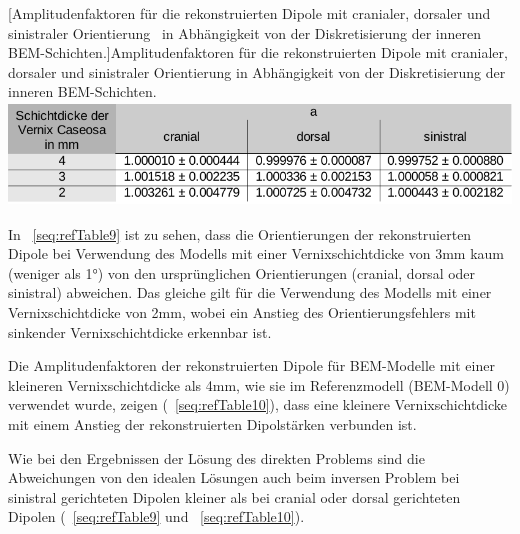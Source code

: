 \begin{center}
\begin{minipage}{17cm}
[Amplitudenfaktoren für die rekonstruierten Dipole mit
cranialer, dorsaler und sinistraler Orientierung \ in Abhängigkeit von
der Diskretisierung der inneren BEM{}-Schichten.]{Amplitudenfaktoren
für die rekonstruierten Dipole mit cranialer, dorsaler und sinistraler
Orientierung  in Abhängigkeit von der Diskretisierung der inneren
BEM-Schichten.}
\label{seq:refTable10}
\includegraphics[width=13.951cm,height=2.752cm]{BA-img/BA-img23.pdf}\end{minipage}
\end{center}
In \tablename~\ref{seq:refTable9} ist zu sehen, dass die Orientierungen
der rekonstruierten Dipole bei Verwendung des Modells mit einer
Vernixschichtdicke von 3mm kaum (weniger als 1°) von den ursprünglichen
Orientierungen (cranial, dorsal oder sinistral) abweichen. Das gleiche
gilt für die Verwendung des Modells mit einer Vernixschichtdicke von
2mm, wobei ein Anstieg des Orientierungsfehlers mit sinkender
Vernixschichtdicke erkennbar ist.

Die Amplitudenfaktoren der rekonstruierten Dipole für BEM-Modelle mit
einer kleineren Vernixschichtdicke als 4mm, wie sie im Referenzmodell
(BEM-Modell 0) verwendet wurde, zeigen
(\tablename~\ref{seq:refTable10}), dass eine kleinere
Vernixschichtdicke mit einem Anstieg der rekonstruierten Dipolstärken
verbunden ist.

Wie bei den Ergebnissen der Lösung des direkten Problems sind die
Abweichungen von den idealen Lösungen auch beim inversen Problem bei
sinistral gerichteten Dipolen kleiner als bei cranial oder dorsal
gerichteten Dipolen (\tablename~\ref{seq:refTable9} und
\tablename~\ref{seq:refTable10}).

